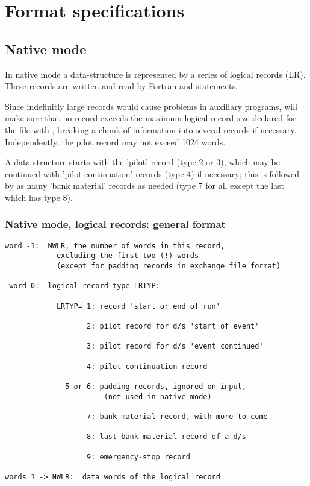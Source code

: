 \chapter{Format specifications}
\label{sec:H1-FZ-format-specs}

\section{Native mode}

In native mode
a data-structure is represented by a series of logical records (LR).
These records are written and read by Fortran  and 
statements.

Since indefinitly large records would cause problems in
auxiliary programs,
 will make sure that no record exceeds the maximum
logical record size declared for the file with ,
breaking a chunk of information into several records if necessary.
Independently, the pilot record may not exceed 1024 words.

A data-structure starts with the 'pilot' record (type 2 or 3),
%
which may be continued with 'pilot continuation' records (type 4)
%
if necessary; this is followed by as many 'bank material' records
%
as needed (type 7 for all except the last which has type 8).

\subsection*{Native mode, logical records: general format}

\begin{verbatim}
word -1:  NWLR, the number of words in this record,
            excluding the first two (!) words
            (except for padding records in exchange file format)

 word 0:  logical record type LRTYP:

            LRTYP= 1: record 'start or end of run'

                   2: pilot record for d/s 'start of event'

                   3: pilot record for d/s 'event continued'

                   4: pilot continuation record

              5 or 6: padding records, ignored on input,
                       (not used in native mode)

                   7: bank material record, with more to come

                   8: last bank material record of a d/s

                   9: emergency-stop record

words 1 -> NWLR:  data words of the logical record
\end{verbatim}

